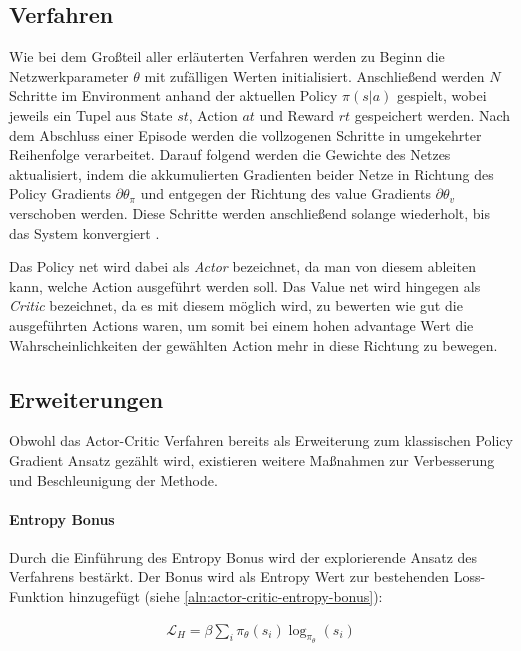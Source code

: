 \documentclass[11pt]{scrartcl}
\begin{document}
\subsection{Verfahren}
Wie bei dem Großteil aller erläuterten Verfahren werden zu Beginn die Netzwerkparameter $\theta$ mit
zufälligen Werten initialisiert. Anschließend werden $N$ Schritte im Environment anhand der aktuellen
Policy $\pi(s|a)$ gespielt, wobei jeweils ein Tupel aus State $st$, Action $at$ und Reward $rt$
gespeichert werden. Nach dem Abschluss einer Episode werden die vollzogenen Schritte in
umgekehrter Reihenfolge verarbeitet. Darauf folgend werden die Gewichte des Netzes aktualisiert, indem
die akkumulierten Gradienten beider Netze in Richtung des Policy Gradients $\partial\theta_\pi$
und entgegen der Richtung des value Gradients $\partial\theta_v$ verschoben werden. Diese Schritte
werden anschließend solange wiederholt, bis das System konvergiert \cite[~S.268 f.]{L2018}.

Das Policy net wird dabei als \textit{Actor} bezeichnet, da man von diesem ableiten kann, welche
Action ausgeführt werden soll. Das Value net wird hingegen als \textit{Critic} bezeichnet, da es mit
diesem möglich wird, zu bewerten wie gut die ausgeführten Actions waren, um somit bei einem hohen
advantage Wert die Wahrscheinlichkeiten der gewählten Action mehr in diese Richtung zu bewegen.

\subsection{Erweiterungen}
Obwohl das Actor-Critic Verfahren bereits als Erweiterung zum klassischen Policy Gradient Ansatz
gezählt wird, existieren weitere Maßnahmen zur Verbesserung und Beschleunigung der Methode.

\paragraph*{Entropy Bonus} 
\noindent
\newline
Durch die Einführung des Entropy Bonus wird der explorierende Ansatz des Verfahrens bestärkt.
Der Bonus wird als Entropy Wert zur bestehenden Loss-Funktion hinzugefügt (siehe
\ref{aln:actor-critic-entropy-bonus}):

\begin{align}
\mathcal{L}_H=\beta\sum_i\pi_\theta(s_i)\log_{\pi_\theta}(s_i)
\label{aln:actor-critic-entropy-bonus}
\end{align}
\end{document}
